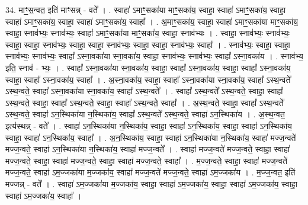 \documentclass[17pt]{extarticle}
\begin{document}
34. माꣳ॒॒स॒न्वत॒ इति॑ माꣳसन्न् - वते᳚ । . स्वाहा॑ ऽमाꣳ॒॒सका॑या माꣳ॒॒सका॑य॒ स्वाहा॒ स्वाहा॑ ऽमाꣳ॒॒सका॑य॒ स्वाहा॒ स्वाहा॑ ऽमाꣳ॒॒सका॑य॒ स्वाहा॒ स्वाहा॑ ऽमाꣳ॒॒सका॑य॒ स्वाहा᳚ । . अ॒माꣳ॒॒सका॑य॒ स्वाहा॒ स्वाहा॑ ऽमाꣳ॒॒सका॑या माꣳ॒॒सका॑य॒ स्वाहा॒ स्नाव॑भ्यः॒ स्नाव॑भ्यः॒ स्वाहा॑ ऽमाꣳ॒॒सका॑या माꣳ॒॒सका॑य॒ स्वाहा॒ स्नाव॑भ्यः । . स्वाहा॒ स्नाव॑भ्यः॒ स्नाव॑भ्यः॒ स्वाहा॒ स्वाहा॒ स्नाव॑भ्यः॒ स्वाहा॒ स्वाहा॒ स्नाव॑भ्यः॒ स्वाहा॒ स्वाहा॒ स्नाव॑भ्यः॒ स्वाहा᳚ । . स्नाव॑भ्यः॒ स्वाहा॒ स्वाहा॒ स्नाव॑भ्यः॒ स्नाव॑भ्यः॒ स्वाहा᳚ ऽस्ना॒वका॑या स्ना॒वका॑य॒ स्वाहा॒ स्नाव॑भ्यः॒ स्नाव॑भ्यः॒ स्वाहा᳚ ऽस्ना॒वका॑य । . स्नाव॑भ्य॒ इति॒ स्नाव॑ - भ्यः॒ । . स्वाहा᳚ ऽस्ना॒वका॑या स्ना॒वका॑य॒ स्वाहा॒ स्वाहा᳚ ऽस्ना॒वका॑य॒ स्वाहा॒ स्वाहा᳚ ऽस्ना॒वका॑य॒ स्वाहा॒ स्वाहा᳚ ऽस्ना॒वका॑य॒ स्वाहा᳚ । . अ॒स्ना॒वका॑य॒ स्वाहा॒ स्वाहा᳚ ऽस्ना॒वका॑या स्ना॒वका॑य॒ स्वाहा᳚ ऽस्थ॒न्वते᳚ ऽस्थ॒न्वते॒ स्वाहा᳚ ऽस्ना॒वका॑या स्ना॒वका॑य॒ स्वाहा᳚ ऽस्थ॒न्वते᳚ । . स्वाहा᳚ ऽस्थ॒न्वते᳚ ऽस्थ॒न्वते॒ स्वाहा॒ स्वाहा᳚ ऽस्थ॒न्वते॒ स्वाहा॒ स्वाहा᳚ ऽस्थ॒न्वते॒ स्वाहा॒ स्वाहा᳚ ऽस्थ॒न्वते॒ स्वाहा᳚ । . अ॒स्थ॒न्वते॒ स्वाहा॒ स्वाहा᳚ ऽस्थ॒न्वते᳚ ऽस्थ॒न्वते॒ स्वाहा॑ ऽन॒स्थिका॑या न॒स्थिका॑य॒ स्वाहा᳚ ऽस्थ॒न्वते᳚ ऽस्थ॒न्वते॒ स्वाहा॑ ऽन॒स्थिका॑य । . अ॒स्थ॒न्वत॒ इत्य॑स्थन्न् - वते᳚ । . स्वाहा॑ ऽन॒स्थिका॑या न॒स्थिका॑य॒ स्वाहा॒ स्वाहा॑ ऽन॒स्थिका॑य॒ स्वाहा॒ स्वाहा॑ ऽन॒स्थिका॑य॒ स्वाहा॒ स्वाहा॑ ऽन॒स्थिका॑य॒ स्वाहा᳚ । . अ॒न॒स्थिका॑य॒ स्वाहा॒ स्वाहा॑ ऽन॒स्थिका॑या न॒स्थिका॑य॒ स्वाहा॑ मज्ज॒न्वते॑ मज्ज॒न्वते॒ स्वाहा॑ ऽन॒स्थिका॑या न॒स्थिका॑य॒ स्वाहा॑ मज्ज॒न्वते᳚ । . स्वाहा॑ मज्ज॒न्वते॑ मज्ज॒न्वते॒ स्वाहा॒ स्वाहा॑ मज्ज॒न्वते॒ स्वाहा॒ स्वाहा॑ मज्ज॒न्वते॒ स्वाहा॒ स्वाहा॑ मज्ज॒न्वते॒ स्वाहा᳚ । . म॒ज्ज॒न्वते॒ स्वाहा॒ स्वाहा॑ मज्ज॒न्वते॑ मज्ज॒न्वते॒ स्वाहा॑ ऽम॒ज्जका॑या म॒ज्जका॑य॒ स्वाहा॑ मज्ज॒न्वते॑ मज्ज॒न्वते॒ स्वाहा॑ ऽम॒ज्जका॑य । . म॒ज्ज॒न्वत॒ इति॑ मज्जन्न् - वते᳚ । . स्वाहा॑ ऽम॒ज्जका॑या म॒ज्जका॑य॒ स्वाहा॒ स्वाहा॑ ऽम॒ज्जका॑य॒ स्वाहा॒ स्वाहा॑ ऽम॒ज्जका॑य॒ स्वाहा॒ स्वाहा॑ ऽम॒ज्जका॑य॒ स्वाहा᳚ । \newline
\end{document}
